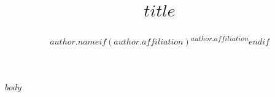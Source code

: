 \documentclass[11pt,a4paper]{article}
\title{$title$}
\author{$author.name$$if(author.affiliation)$\textsuperscript{$author.affiliation$}$endif$}
\affil[$it.key$]{$it.value$}
\date{}
\begin{document}
\maketitle

$body$
\end{document}
